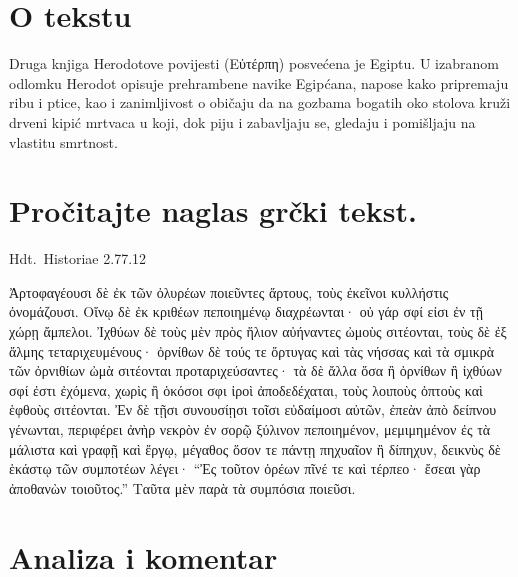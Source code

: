 

\section*{O tekstu}

Druga knjiga Herodotove povijesti \textgreek[variant=ancient]{(Εὐτέρπη)} posvećena je Egiptu. U izabranom odlomku Herodot opisuje prehrambene navike Egipćana, napose kako pripremaju ribu i ptice, kao i zanimljivost o običaju da na gozbama bogatih oko stolova kruži drveni kipić mrtvaca u koji, dok piju i zabavljaju se, gledaju i pomišljaju na vlastitu smrtnost.


\section*{Pročitajte naglas grčki tekst.}

Hdt.\ Historiae 2.77.12


\medskip

\begin{greek}
{\large
{ \noindent Ἀρτοφαγέουσι δὲ ἐκ τῶν ὀλυρέων ποιεῦντες ἄρτους, τοὺς ἐκεῖνοι κυλλήστις ὀνομάζουσι. Οἴνῳ δὲ ἐκ κριθέων πεποιημένῳ διαχρέωνται· οὐ γάρ σφί εἰσι ἐν τῇ χώρῃ ἄμπελοι. Ἰχθύων δὲ τοὺς μὲν πρὸς ἥλιον αὐήναντες ὠμοὺς σιτέονται, τοὺς δὲ ἐξ ἅλμης τεταριχευμένους· ὀρνίθων δὲ τούς τε ὄρτυγας καὶ τὰς νήσσας καὶ τὰ σμικρὰ τῶν ὀρνιθίων ὠμὰ σιτέονται προταριχεύσαντες· τὰ δὲ ἄλλα ὅσα ἢ ὀρνίθων ἢ ἰχθύων σφί ἐστι ἐχόμενα, χωρὶς ἢ ὁκόσοι σφι ἱροὶ ἀποδεδέχαται, τοὺς λοιποὺς ὀπτοὺς καὶ ἑφθοὺς σιτέονται. Ἐν δὲ τῇσι συνουσίῃσι τοῖσι εὐδαίμοσι αὐτῶν, ἐπεὰν ἀπὸ δείπνου γένωνται, περιφέρει ἀνὴρ νεκρὸν ἐν σορῷ ξύλινον πεποιημένον, μεμιμημένον ἐς τὰ μάλιστα καὶ γραφῇ καὶ ἔργῳ, μέγαθος ὅσον τε πάντῃ πηχυαῖον ἢ δίπηχυν, δεικνὺς δὲ ἑκάστῳ τῶν συμποτέων λέγει· ``Ἐς τοῦτον ὁρέων πῖνέ τε καὶ τέρπεο· ἔσεαι γὰρ ἀποθανὼν τοιοῦτος.'' Ταῦτα μὲν παρὰ τὰ συμπόσια ποιεῦσι.

}
}
\end{greek}

\section*{Analiza i komentar}

